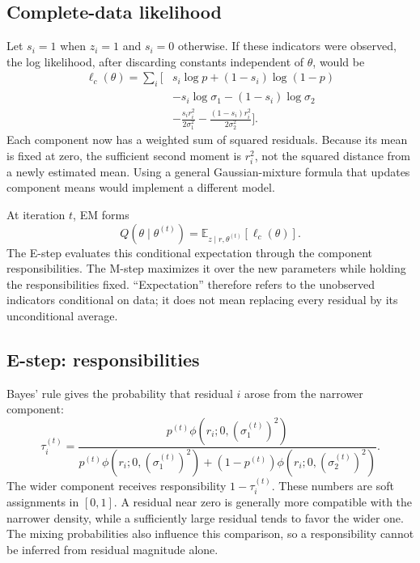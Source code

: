 \documentclass[conference,letterpaper]{IEEEtran}
\newcommand{\E}{\mathbb{E}}
\begin{document}
\subsection{Complete-data likelihood}
Let $s_i=1$ when $z_i=1$ and $s_i=0$ otherwise. If these indicators were observed, the log likelihood, after discarding constants independent of $\theta$, would be
\begin{align}
\ell_c(\theta)=\sum_i \bigg[&s_i\log p+(1-s_i)\log(1-p)\nonumber\\
&-s_i\log\sigma_1-(1-s_i)\log\sigma_2\nonumber\\
&-\frac{s_i r_i^2}{2\sigma_1^2}
-\frac{(1-s_i)r_i^2}{2\sigma_2^2}\bigg].
\label{eq:complete}
\end{align}
Each component now has a weighted sum of squared residuals. Because its mean is fixed at zero, the sufficient second moment is $r_i^2$, not the squared distance from a newly estimated mean. Using a general Gaussian-mixture formula that updates component means would implement a different model.

At iteration $t$, EM forms
\begin{equation}
Q(\theta\mid\theta^{(t)})=
\E_{z\mid r,\theta^{(t)}}[\ell_c(\theta)].
\end{equation}
The E-step evaluates this conditional expectation through the component responsibilities. The M-step maximizes it over the new parameters while holding the responsibilities fixed. ``Expectation'' therefore refers to the unobserved indicators conditional on data; it does not mean replacing every residual by its unconditional average.

\subsection{E-step: responsibilities}
Bayes' rule gives the probability that residual $i$ arose from the narrower component:
\begin{equation}
\tau_i^{(t)}=
\frac{p^{(t)}\phi(r_i;0,(\sigma_1^{(t)})^2)}
{p^{(t)}\phi(r_i;0,(\sigma_1^{(t)})^2)
+(1-p^{(t)})\phi(r_i;0,(\sigma_2^{(t)})^2)}.
\label{eq:responsibility}
\end{equation}
The wider component receives responsibility $1-\tau_i^{(t)}$. These numbers are soft assignments in $[0,1]$. A residual near zero is generally more compatible with the narrower density, while a sufficiently large residual tends to favor the wider one. The mixing probabilities also influence this comparison, so a responsibility cannot be inferred from residual magnitude alone.
\end{document}
